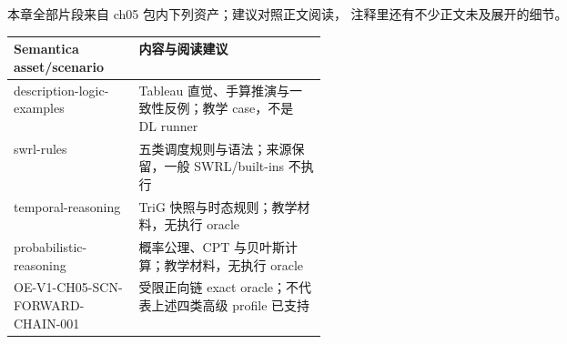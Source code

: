 本章全部片段来自 ch05 包内下列资产；建议对照正文阅读，
注释里还有不少正文未及展开的细节。

\begin{center}
\begin{tabularx}{\linewidth}{@{}>{\ttfamily\footnotesize}p{0.40\linewidth}X@{}}
\toprule
\normalfont\textbf{Semantica asset/scenario} & \textbf{内容与阅读建议} \\
\midrule
description-logic-examples & Tableau 直觉、手算推演与一致性反例；教学 case，不是 DL runner \\
swrl-rules & 五类调度规则与语法；来源保留，一般 SWRL/built-ins 不执行 \\
temporal-reasoning & TriG 快照与时态规则；教学材料，无执行 oracle \\
probabilistic-reasoning & 概率公理、CPT 与贝叶斯计算；教学材料，无执行 oracle \\
OE-V1-CH05-SCN-FORWARD-CHAIN-001 & 受限正向链 exact oracle；不代表上述四类高级 profile 已支持 \\
\bottomrule
\end{tabularx}
\end{center}
